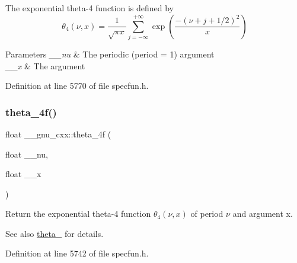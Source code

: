 The exponential theta-\/4 function is defined by \[ \theta_4(\nu,x) = \frac{1}{\sqrt{\pi x}} \sum_{j=-\infty}^{+\infty} \exp\left( \frac{-(\nu + j + 1/2)^2}{x} \right) \]


\begin{DoxyParams}{Parameters}
{\em \+\_\+\+\_\+nu} & The periodic (period = 1) argument \\
\hline
{\em \+\_\+\+\_\+x} & The argument \\
\hline
\end{DoxyParams}


Definition at line 5770 of file specfun.\+h.

\mbox{\label{group__mathsf__gnu_ga0c5cbf87e304844ed4c3423be5ca09a5}} 
\subsubsection{\texorpdfstring{theta\+\_\+4f()}{theta\_4f()}}
{\footnotesize\ttfamily float \+\_\+\+\_\+gnu\+\_\+cxx\+::theta\+\_\+4f (\begin{DoxyParamCaption}\item[{float}]{\+\_\+\+\_\+nu,  }\item[{float}]{\+\_\+\+\_\+x }\end{DoxyParamCaption})\hspace{0.3cm}{\ttfamily [inline]}}

Return the exponential theta-\/4 function $ \theta_4(\nu,x) $ of period $ \nu $ and argument {\ttfamily x}.

\begin{DoxySeeAlso}{See also}
\hyperlink{group__mathsf__gnu_ga8a6f8b69272a9f205a13e1745832ada3}{theta\+\_} for details. 
\end{DoxySeeAlso}


Definition at line 5742 of file specfun.\+h.

\mbox{\label{group__mathsf__gnu_gaaf63a80e90cdcdd66ebb18cd3a84afae}} 
